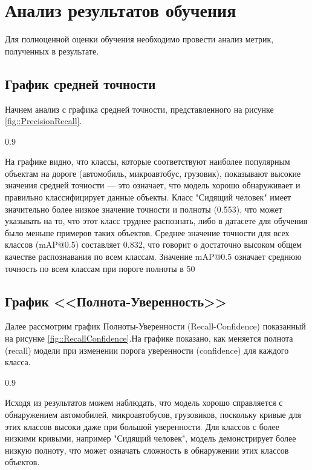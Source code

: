 \chapter{Анализ результатов обучения}

Для полноценной оценки обучения необходимо провести анализ метрик, полученных в
результате.

\section{График средней точности}

Начнем анализ с графика средней точности, представленного на рисунке 
\ref{fig::PrecisionRecall}.

{0.9}

На графике видно, что классы, которые соответствуют наиболее популярным объектам
на дороге (автомобиль, микроавтобус, грузовик), показывают высокие значения 
средней точности --- это означает, что модель хорошо обнаруживает и правильно 
классифицирует данные объекты. Класс "Сидящий человек" имеет значительно более
низкое значение точности и полноты (0.553), что может указывать на то, что этот
класс труднее распознать, либо в датасете для обучения было меньше примеров таких
объектов. Среднее значение точности для всех классов (mAP@0.5) составляет 0.832,
что говорит о достаточно высоком общем качестве распознавания по всем классам.
Значение mAP@0.5 означает среднюю точность по всем классам при пороге полноты в 50%

\section{График <<Полнота-Уверенность>>}

Далее рассмотрим график Полноты-Уверенности (Recall-Confidence) показанный на 
рисунке \ref{fig::RecallConfidence}.На графике показано, как меняется полнота
(recall) модели при изменении порога уверенности (confidence) для каждого класса.

{0.9}

Исходя из результатов можем наблюдать, что модель хорошо справляется с обнаружением
автомобилей, микроавтобусов, грузовиков, поскольку кривые для этих классов высоки
даже при большой уверенности. Для классов с более низкими кривыми, например "Сидящий
человек", модель демонстрирует более низкую полноту, что может означать сложность в
обнаружении этих классов объектов.

